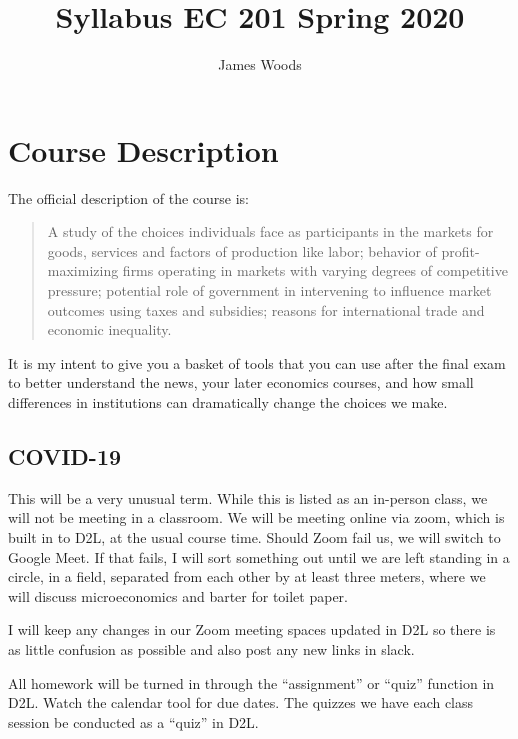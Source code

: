 \documentclass[
]{article}
\title{Syllabus EC 201 Spring 2020}
\author{James Woods}
\date{}
\begin{document}
\maketitle

\hypertarget{course-description}{%
\section{Course Description}\label{course-description}}

The official description of the course is:

\begin{quote}
A study of the choices individuals face as participants in the markets
for goods, services and factors of production like labor; behavior of
profit-maximizing firms operating in markets with varying degrees of
competitive pressure; potential role of government in intervening to
influence market outcomes using taxes and subsidies; reasons for
international trade and economic inequality.
\end{quote}

It is my intent to give you a basket of tools that you can use after the
final exam to better understand the news, your later economics courses,
and how small differences in institutions can dramatically change the
choices we make.

\hypertarget{covid-19}{%
\subsection{COVID-19}\label{covid-19}}

This will be a very unusual term. While this is listed as an in-person
class, we will not be meeting in a classroom. We will be meeting online
via zoom, which is built in to D2L, at the usual course time. Should
Zoom fail us, we will switch to Google Meet. If that fails, I will sort
something out until we are left standing in a circle, in a field,
separated from each other by at least three meters, where we will
discuss microeconomics and barter for toilet paper.

I will keep any changes in our Zoom meeting spaces updated in D2L so
there is as little confusion as possible and also post any new links in
slack.

All homework will be turned in through the ``assignment'' or ``quiz''
function in D2L. Watch the calendar tool for due dates. The quizzes we
have each class session be conducted as a ``quiz'' in D2L.
\end{document}
